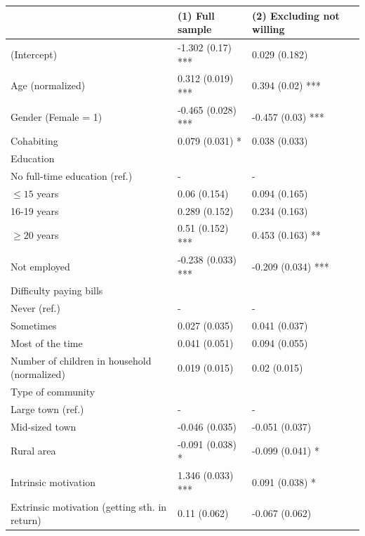 \documentclass[AER]{AEA}
\begin{document}
\begin{table}[hbt!]
    \centering
    \begin{tabular}{p{8cm}|l|p{3cm}}
           & (1) Full sample & (2) Excluding not willing\\ \hline \hline
(Intercept) & -1.302 (0.17) *** & 0.029 (0.182)\\ 
Age (normalized) & 0.312 (0.019) *** & 0.394 (0.02) ***\\ 
Gender (Female = 1) & -0.465 (0.028) *** & -0.457 (0.03) ***\\ 
Cohabiting & 0.079 (0.031) * & 0.038 (0.033)\\ 
Education &  & \\ 
\hspace{0.7cm} No full-time education (ref.) & - & -\\ 
\hspace{0.7cm} $\leq 15$ years & 0.06 (0.154) & 0.094 (0.165)\\ 
\hspace{0.7cm} 16-19 years & 0.289 (0.152) & 0.234 (0.163)\\ 
\hspace{0.7cm} $\geq 20$ years & 0.51 (0.152) *** & 0.453 (0.163) **\\ 
Not employed & -0.238 (0.033) *** & -0.209 (0.034) ***\\ 
Difficulty paying bills &  & \\ 
\hspace{0.7cm} Never (ref.) & - & -\\ 
\hspace{0.7cm} Sometimes & 0.027 (0.035) & 0.041 (0.037)\\ 
\hspace{0.7cm} Most of the time & 0.041 (0.051) & 0.094 (0.055)\\ 
Number of children in household (normalized) & 0.019 (0.015) & 0.02 (0.015)\\ 
Type of community & & \\ 
\hspace{0.7cm} Large town (ref.) & - & -\\ 
\hspace{0.7cm} Mid-sized town & -0.046 (0.035) & -0.051 (0.037)\\ 
\hspace{0.7cm} Rural area & -0.091 (0.038) * & -0.099 (0.041) *\\ 
Intrinsic motivation & 1.346 (0.033) *** & 0.091 (0.038) *\\ 
Extrinsic motivation (getting sth. in return) & 0.11 (0.062) & -0.067 (0.062)\\ 

\end{tabular}
\end{table}
\end{document}
